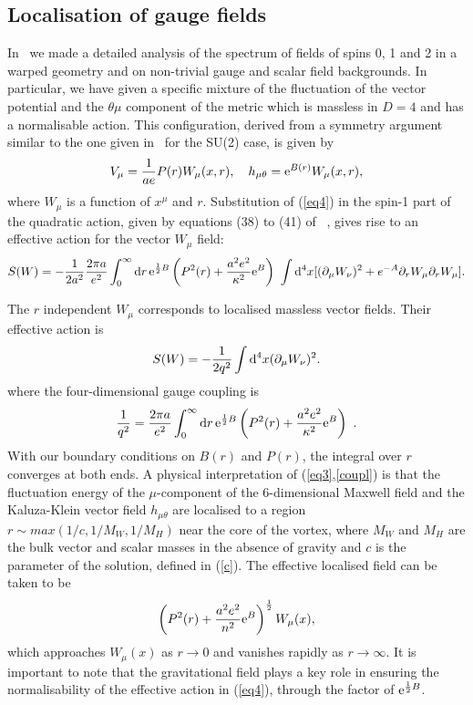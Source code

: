 \documentclass[a4paper,12pt]{article}
\begin{document}
\subsection{Localisation of gauge fields}
In~\cite{Randjbar-Daemi:2002pq} we made a detailed analysis of the
spectrum of fields of spins 0, 1 and 2 in a warped geometry and on
non-trivial gauge and scalar field backgrounds. In particular, we
have given a specific mixture of the fluctuation of the vector
potential and the $\theta\mu$ component of the metric which is
massless in  $D=4$  and has a normalisable action. This
configuration, derived from a symmetry argument similar to the one
given in~\cite{Randjbar-Daemi:1982hi} for the SU(2) case, is given by
\begin{equation}
V_\mu={1\over ae}P(r)W_\mu(x, r),\quad h_{\mu\theta}={\rm
e}^{B(r)}W_\mu(x,r),
\label{eq4}
\end{equation}
where $W_\mu$ is a function of $x^{\mu}$ and $r$.  Substitution of
(\ref{eq4}) in the spin-1 part of the quadratic action, given by
equations (38) to (41) of~ \cite{Randjbar-Daemi:2002pq}, gives rise to an
effective action for the vector $W_\mu$ field:
\begin{equation}
S(W)= -\frac{1}{2 a^2}{2\pi a\over e^2}\int_0^\infty{\rm d}r\,{\rm
e}^{{1\over 2}B} \left(P^2(r)+{a^2e^2\over \kappa^2}{\rm e}^B\right)~
\int{\rm d}^4x[(\partial_\mu  W_\nu)^2 + e^{-A} \partial_r
W_\mu\partial_r W_\mu].
\label{eq3'}
\end{equation}

The $r$ independent $W_\mu$ corresponds to localised massless vector
fields. Their effective action is 
\begin{equation}
S(W)= -\frac{1}{2 q^2} \int{\rm d}^4x(\partial_\mu 
W_\nu)^2.
\label{eq3}
\end{equation}
 where the four-dimensional gauge coupling is
\begin{equation}
\frac{1}{q^2}=
{2\pi a\over e^2}\int_0^\infty{\rm d}r\,{\rm e}^{{1\over 2}B}
\left(P^2(r)+{a^2e^2\over \kappa^2}{\rm e}^B\right)~.
\label{coupl}
\end{equation}
With our boundary conditions on $B(r)$ and $P(r)$, the integral over
$r$ converges at both ends.  A physical interpretation of
(\ref{eq3},\ref{coupl}) is that the fluctuation energy of the
$\mu$-component of the 6-dimensional Maxwell field and the
Kaluza-Klein vector field  $h_{\mu\theta}$ are localised to a region
$r \sim max(1/c,1/M_W,1/M_H)$ near the core of the vortex, where
$M_W$ and $M_H$ are the bulk vector and scalar masses in the
absence of gravity and $c$ is the parameter of the solution, defined
in (\ref{c}). The effective localised field can be taken to be
\[
 \left(P^2(r)+{a^2e^2\over n^2}{\rm e}^B\right)^{1\over 2}
W_\mu(x),
\]
which approaches $W_\mu(x)$ as $r\to 0$ and vanishes rapidly as
$r\to\infty$. It is important to note that the gravitational field
plays a key role in ensuring the normalisability of the effective
action in (\ref{eq4}), through the factor of 
${\rm e}^{{1\over 2}B}$. 
 
\end{document}
